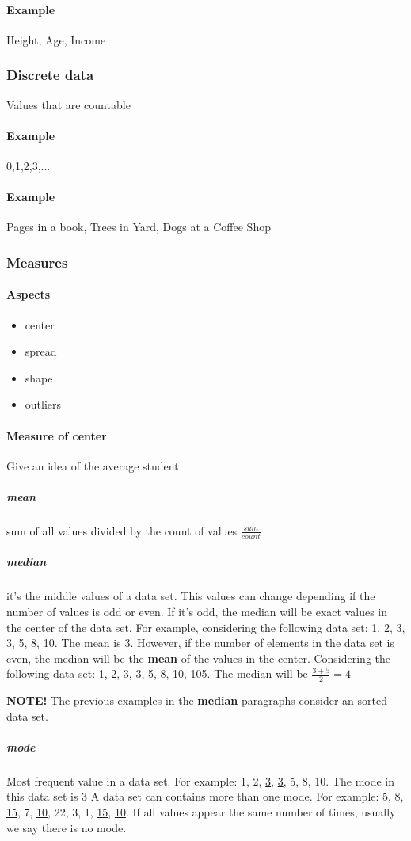 \documentclass[]{article}
\begin{document}
\paragraph{Example} Height, Age, Income

\subsubsection{Discrete data}
Values that are countable
\paragraph{Example} 0,1,2,3,...
\paragraph{Example} Pages in a book, Trees in Yard, Dogs at a Coffee Shop


\subsubsection{Measures}
\paragraph{Aspects}
\begin{itemize}
\item center
\item spread
\item shape
\item outliers
\end{itemize}

\paragraph{Measure of center} Give an idea of the average student
\subparagraph{mean} sum of all values divided by the count of values $ \frac{sum}{count} $
\subparagraph{median} it's the middle values of a data set. This values can change depending if the number of values is odd or even. If it's odd, the median will be exact values in the center of the data set. For example, considering the following data set: 1, 2, 3, 3, 5, 8, 10. The mean is 3. 
However, if the number of elements in the data set is even, the median will be the \textbf{mean} of the values in the center. Considering the following data set: 1, 2, 3, 3, 5, 8, 10, 105. The median will be $ \frac{3+5}{2} = 4 $

\textbf{NOTE!} The previous examples in the \textbf{median} paragraphs consider an sorted data set.
\subparagraph{mode} Most frequent value in a data set. For example: 1, 2, \underline{3}, \underline{3}, 5, 8, 10. The mode in this data set is 3
A data set can contains more than one mode. For example: 5, 8, \underline{15}, 7, \underline{10}, 22, 3, 1, \underline{15}, \underline{10}. If all values appear the same number of times, usually we say there is no mode.
\end{document}
